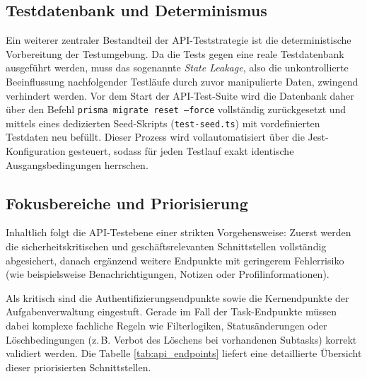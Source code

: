 \subsection{Testdatenbank und Determinismus}
Ein weiterer zentraler Bestandteil der API-Teststrategie ist die deterministische Vorbereitung der Testumgebung. Da die Tests gegen eine reale Testdatenbank ausgeführt werden, muss das sogenannte \textit{State Leakage}, also die unkontrollierte Beeinflussung nachfolgender Testläufe durch zuvor manipulierte Daten, zwingend verhindert werden. Vor dem Start der API-Test-Suite wird die Datenbank daher über den Befehl \texttt{prisma migrate reset --force} vollständig zurückgesetzt und mittels eines dedizierten Seed-Skripts (\texttt{test-seed.ts}) mit vordefinierten Testdaten neu befüllt. Dieser Prozess wird vollautomatisiert über die Jest-Konfiguration gesteuert, sodass für jeden Testlauf exakt identische Ausgangsbedingungen herrschen.

\subsection{Fokusbereiche und Priorisierung}
Inhaltlich folgt die API-Testebene einer strikten Vorgehensweise: Zuerst werden die sicherheitskritischen und geschäftsrelevanten Schnittstellen vollständig abgesichert, danach ergänzend weitere Endpunkte mit geringerem Fehlerrisiko (wie beispielsweise Benachrichtigungen, Notizen oder Profilinformationen). 

Als kritisch sind die Authentifizierungsendpunkte sowie die Kernendpunkte der Aufgabenverwaltung eingestuft. Gerade im Fall der Task-Endpunkte müssen dabei komplexe fachliche Regeln wie Filterlogiken, Statusänderungen oder Löschbedingungen (z.\,B. Verbot des Löschens bei vorhandenen Subtasks) korrekt validiert werden. Die Tabelle \ref{tab:api_endpoints} liefert eine detaillierte Übersicht dieser priorisierten Schnittstellen.

